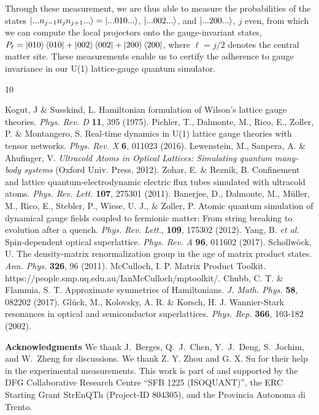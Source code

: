 \documentclass[aps,prl,twocolumn,superscriptaddress,footinbib,linenumbers]{revtex4}
\begin{document}
Through these measurement, we are thus able to measure the probabilities of the states $\ket{...n_{j-1} n_{j} n_{j+1}...}=\ket{...010...}$, $\ket{...002...}$, and $\ket{...200...}$, $j$ even, from which we can compute the local projectors onto the gauge-invariant states, $P_\ell=\ket{010}\bra{010}+\ket{002}\bra{002}+\ket{200}\bra{200}$, where $\ell=j/2$ denotes the central matter site. These measurements enable us to certify the adherence to gauge invariance in our U(1) lattice-gauge quantum simulator.



\begin{thebibliography}{10}
\makeatletter
\addtocounter{NAT@ctr}{35}
\makeatother
{} Kogut, J \& Susskind, L. Hamiltonian formulation of Wilson's lattice gauge theories. \emph{Phys. Rev. D} \textbf{11}, 395 (1975).
 Pichler, T., Dalmonte, M., Rico, E., Zoller, P. \& Montangero, S. Real-time dynamics in U(1) lattice gauge theories with tensor networks. \emph{Phys. Rev. X} \textbf{6}, 011023 (2016).
 Lewenstein, M., Sanpera, A. \& Ahufinger, V. \emph{Ultracold Atoms in Optical Lattices: Simulating quantum many-body systems} (Oxford Univ. Press, 2012).
Zohar, E. \& Reznik, B. Confinement and lattice quantum-electrodynamic electric flux tubes simulated with ultracold atoms. \emph{Phys. Rev. Lett.} \textbf{107}, 275301 (2011).
 Banerjee, D., Dalmonte, M., M\"uller, M., Rico, E., Stebler, P., Wiese, U. J., \& Zoller, P. Atomic quantum simulation of dynamical gauge fields coupled to fermionic matter: From string breaking to evolution after a quench. \emph{Phys. Rev. Lett.}, \textbf{109}, 175302 (2012).
 Yang, B. \emph{et al.} Spin-dependent optical superlattice. \emph{Phys. Rev. A} \textbf{96}, 011602 (2017).
 Schollw\"{o}ck, U. The density-matrix renormalization group in the age of matrix product states. \emph{Ann. Phys.} \textbf{326}, 96 (2011).
 McCulloch, I. P. Matrix Product Toolkit. https://people.smp.uq.edu.au/IanMcCulloch/mptoolkit/.
 Chubb, C. T. \& Flammia, S. T. Approximate symmetries of Hamiltonians. \emph{J. Math. Phys.} \textbf{58}, 082202 (2017).
 Gl\"uck, M., Kolovsky, A. R. \& Korsch, H. J. Wannier-Stark resonances in optical and semiconductor superlattices. \emph{Phys. Rep.} \textbf{366}, 103-182 (2002).

\end{thebibliography}


\textbf{Acknowledgments} We thank J.~Berges, Q.~J.~Chen, Y.~J.~Deng, S.~Jochim, and W.~Zheng for discussions. We thank Z. Y. Zhou and G. X. Su for their help in the experimental measurements. This work is part of and supported by the DFG Collaborative Research Centre ``SFB 1225 (ISOQUANT)'',  the ERC Starting Grant StrEnQTh (Project-ID  804305), and the Provincia Autonoma di Trento.


\newpage
\onecolumngrid
\end{document}
